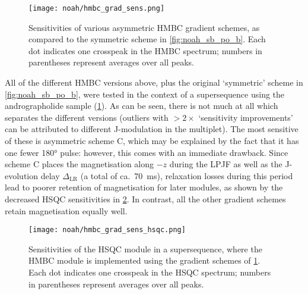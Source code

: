\begin{figure}[htb]
    \centering
    \texttt{[image: noah/hmbc\_grad\_sens.png]}%
    \caption[Comparison of relative sensitivities of HMBC gradient schemes]{
        Sensitivities of various asymmetric HMBC gradient schemes, as compared to the symmetric scheme in \cref{fig:noah_sb_po_b}.
        Each dot indicates one crosspeak in the HMBC spectrum; numbers in parentheses represent averages over all peaks.
    }
    \label{fig:hmbc_grad_sens}
\end{figure}

All of the different HMBC versions above, plus the original `symmetric' scheme in \cref{fig:noah_sb_po_b}, were tested in the context of a  supersequence using the andrographolide sample (\cref{fig:hmbc_grad_sens}).
As can be seen, there is not much at all which separates the different versions (outliers with $>2\times$ `sensitivity improvements' can be attributed to different J-modulation in the multiplet).
The most sensitive of these is asymmetric scheme C, which may be explained by the fact that it has one fewer \ang{180} pulse: however, this comes with an immediate drawback.
Since scheme C places the  magnetisation along $-z$ during the LPJF as well as the J-evolution delay $\Delta_\text{LR}$ (a total of ca.\ \qty{70}{\ms}), relaxation losses during this period lead to poorer retention of  magnetisation for later modules, as shown by the decreased HSQC sensitivities in \cref{fig:hmbc_grad_sens_hsqc}.
In contrast, all the other gradient schemes retain  magnetisation equally well.

\begin{figure}[htb]
    \centering
    \texttt{[image: noah/hmbc\_grad\_sens\_hsqc.png]}%
    \caption[Effect of HMBC gradient scheme on HSQC sensitivity in a  supersequence]{
        Sensitivities of the HSQC module in a  supersequence, where the HMBC module is implemented using the gradient schemes of \cref{fig:hmbc_grad_sens}.
        Each dot indicates one crosspeak in the HSQC spectrum; numbers in parentheses represent averages over all peaks.
    }
    \label{fig:hmbc_grad_sens_hsqc}
\end{figure}

